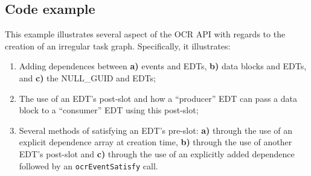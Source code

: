 \subsection{Code example}
This example illustrates several aspect of the OCR API with regards to
the creation of an irregular task graph. Specifically, it illustrates:
\begin{enumerate}
\item{Adding dependences between {\bf a)} events and EDTs, {\bf b)}
    data blocks and EDTs, and {\bf c)} the NULL\_GUID and EDTs;}
\item{The use of an EDT's post-slot and how a ``producer'' EDT can
    pass a data block to a ``consumer'' EDT using this post-slot;}
\item{Several methods of satisfying an EDT's pre-slot: {\bf a)}
    through the use of an explicit dependence array at creation time,
    {\bf b)} through the use of another EDT's post-slot and {\bf c)}
    through the use of an explicitly added dependence followed by an
    \texttt{ocrEventSatisfy} call.}
\end{enumerate}
